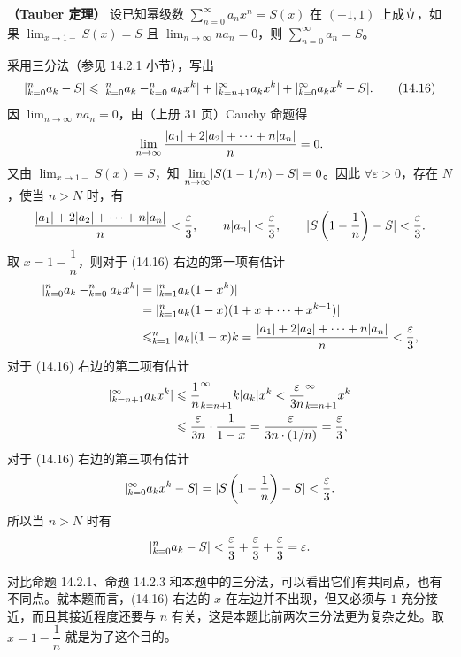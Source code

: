 \begin{xproposition}[14.3.4]
\textbf{（Tauber 定理）} 设已知幂级数 $\displaystyle\sum_{n=0}^{\infty}a_nx^n=S(x)$ 在 $(-1,1)$ 上成立，如果 $\displaystyle\lim_{x\to1-}S(x)=S$ 且 $\displaystyle\lim_{n\to\infty}na_n=0$，则 $\displaystyle\sum_{n=0}^{\infty}a_n=S$。
\end{xproposition}
\begin{xproof}
采用三分法（参见 14.2.1 小节），写出
\begin{equation}
  \lvert\relax_{k=0}^{n}a_k-S\rvert
  \leqslant
  \lvert\relax_{k=0}^{n}a_k-\relax_{k=0}^{n}a_kx^k\rvert
  +\lvert\relax_{k=n+1}^{\infty}a_kx^k\rvert
  +\lvert\relax_{k=0}^{\infty}a_kx^k-S\rvert.
  \tag{14.16}
  \label{eq:14.16}
\end{equation}
因 $\displaystyle\lim_{n\to\infty}na_n=0$，由（上册 31 页）Cauchy 命题得
\[
  \lim_{n\to\infty}\frac{\lvert a_1\rvert+2\lvert a_2\rvert+\cdots+n\lvert a_n\rvert}{n}=0.
\]
又由 $\displaystyle\lim_{x\to1-}S(x)=S$，知 $\displaystyle\lim_{n\to\infty}\lvert S(1-1/n)-S\rvert=0$。因此 $\forall\varepsilon>0$，存在 $N$，使当 $n>N$ 时，有
\[
  \frac{\lvert a_1\rvert+2\lvert a_2\rvert+\cdots+n\lvert a_n\rvert}{n}<\frac\varepsilon3,
  \qquad n\lvert a_n\rvert<\frac\varepsilon3,
  \qquad \lvert S\left(1-\frac1n\right)-S\rvert<\frac\varepsilon3.
\]
取 $x=1-\dfrac1n$，则对于 (14.16) 右边的第一项有估计
\[
\begin{aligned}
  \lvert\relax_{k=0}^{n}a_k-\relax_{k=0}^{n}a_kx^k\rvert
  &=\lvert\relax_{k=1}^{n}a_k(1-x^k)\rvert\\
  &=\lvert\relax_{k=1}^{n}a_k(1-x)(1+x+\cdots+x^{k-1})\rvert\\
  &\leqslant\relax_{k=1}^{n}\lvert a_k\rvert(1-x)k
  =\frac{\lvert a_1\rvert+2\lvert a_2\rvert+\cdots+n\lvert a_n\rvert}{n}<\frac\varepsilon3,
\end{aligned}
\]
对于 (14.16) 右边的第二项有估计
\[
\begin{aligned}
  \lvert\relax_{k=n+1}^{\infty}a_kx^k\rvert
  &\leqslant\frac1n\relax_{k=n+1}^{\infty}k\lvert a_k\rvert x^k
  <\frac\varepsilon{3n}\relax_{k=n+1}^{\infty}x^k\\
  &\leqslant\frac\varepsilon{3n}\cdot\frac1{1-x}
  =\frac\varepsilon{3n\cdot(1/n)}=\frac\varepsilon3,
\end{aligned}
\]
对于 (14.16) 右边的第三项有估计
\[
  \lvert\relax_{k=0}^{\infty}a_kx^k-S\rvert=\lvert S\left(1-\frac1n\right)-S\rvert<\frac\varepsilon3.
\]
所以当 $n>N$ 时有
\[
  \lvert\relax_{k=0}^{n}a_k-S\rvert<\frac\varepsilon3+\frac\varepsilon3+\frac\varepsilon3=\varepsilon.
\]
\end{xproof}

\begin{xremark}
对比命题 14.2.1、命题 14.2.3 和本题中的三分法，可以看出它们有共同点，也有不同点。就本题而言，(14.16) 右边的 $x$ 在左边并不出现，但又必须与 $1$ 充分接近，而且其接近程度还要与 $n$ 有关，这是本题比前两次三分法更为复杂之处。取 $x=1-\dfrac1n$ 就是为了这个目的。
\end{xremark}

